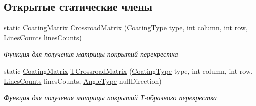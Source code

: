 \subsection*{Открытые статические члены}
\begin{DoxyCompactItemize}
\item 
static \hyperlink{namespacertm_ae3bb29510cfde424975be31866d2486e}{Coating\+Matrix} \hyperlink{classrtm_1_1_crossroad_object_a11e6cc77965034adf630b5ac47ab1222}{Crossroad\+Matrix} (\hyperlink{namespacertm_aecd3929e64cd461eb3555b611f6fad95}{Coating\+Type} type, int column, int row, \hyperlink{namespacertm_a14457f3088a92b86a96686b72d3e4eea}{Lines\+Counts} lines\+Counts)
\begin{DoxyCompactList}\small\item\em Функция для получения матрицы покрытий перекрестка \end{DoxyCompactList}\item 
static \hyperlink{namespacertm_ae3bb29510cfde424975be31866d2486e}{Coating\+Matrix} \hyperlink{classrtm_1_1_crossroad_object_a24683882ff8728973a1260ff7acc7a02}{T\+Crossroad\+Matrix} (\hyperlink{namespacertm_aecd3929e64cd461eb3555b611f6fad95}{Coating\+Type} type, int column, int row, \hyperlink{namespacertm_a14457f3088a92b86a96686b72d3e4eea}{Lines\+Counts} lines\+Counts, \hyperlink{namespacertm_a69dc82b16a0148c10962caa83d930f89}{Angle\+Type} null\+Direction)
\begin{DoxyCompactList}\small\item\em Функция для получения матрицы покрытий Т-\/образного перекрестка \end{DoxyCompactList}\end{DoxyCompactItemize}
